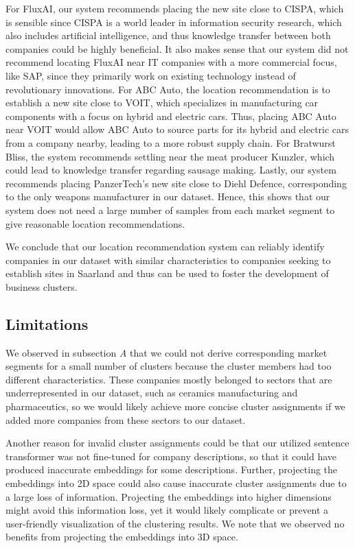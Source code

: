 \documentclass[conference]{IEEEtran}
\begin{document}
For FluxAI, our system recommends placing the new site close to CISPA, which is sensible since CISPA is a world leader in information security research, which also includes artificial intelligence, and thus knowledge transfer between both companies could be highly beneficial. It also makes sense that our system did not recommend locating FluxAI near IT companies with a more commercial focus, like SAP, since they primarily work on existing technology instead of revolutionary innovations.
For ABC Auto, the location recommendation is to establish a new site close to VOIT, which specializes in manufacturing car components with a focus on hybrid and electric cars. Thus, placing ABC Auto near VOIT would allow ABC Auto to source parts for its hybrid and electric cars from a company nearby, leading to a more robust supply chain.
For Bratwurst Bliss, the system recommends settling near the meat producer Kunzler, which could lead to knowledge transfer regarding sausage making.
Lastly, our system recommends placing PanzerTech's new site close to Diehl Defence, corresponding to the only weapons manufacturer in our dataset. Hence, this shows that our system does not need a large number of samples from each market segment to give reasonable location recommendations.

We conclude that our location recommendation system can reliably identify companies in our dataset with similar characteristics to companies seeking to establish sites in Saarland and thus can be used to foster the development of business clusters.


\subsection{Limitations}
We observed in subsection \textit{A} that we could not derive corresponding market segments for a small number of clusters because the cluster members had too different characteristics. These companies mostly belonged to sectors that are underrepresented in our dataset, such as ceramics manufacturing and pharmaceutics, so we would likely achieve more concise cluster assignments if we added more companies from these sectors to our dataset.

Another reason for invalid cluster assignments could be that our utilized sentence transformer was not fine-tuned for company descriptions, so that it could have produced inaccurate embeddings for some descriptions. Further, projecting the embeddings into 2D space could also cause inaccurate cluster assignments due to a large loss of information. Projecting the embeddings into higher dimensions might avoid this information loss, yet it would likely complicate or prevent a user-friendly visualization of the clustering results. We note that we observed no benefits from projecting the embeddings into 3D space.
\end{document}

